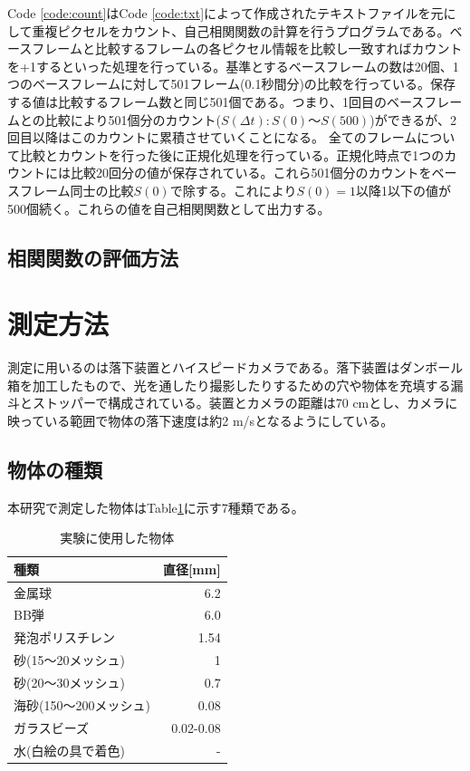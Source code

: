 \documentclass[a4paper,10pt,twocolumn,dvipdfmx]{jsarticle}
\newcommand{\Dt}{\Delta t}
\begin{document}

Code \ref{code:count}はCode \ref{code:txt}によって作成されたテキストファイルを元にして重複ピクセルをカウント、自己相関関数の計算を行うプログラムである。ベースフレームと比較するフレームの各ピクセル情報を比較し一致すればカウントを+1するといった処理を行っている。基準とするベースフレームの数は20個、1つのベースフレームに対して501フレーム(0.1秒間分)の比較を行っている。保存する値は比較するフレーム数と同じ501個である。つまり、1回目のベースフレームとの比較により501個分のカウント($S(\Dt):S(0)〜S(500)$)ができるが、2回目以降はこのカウントに累積させていくことになる。
全てのフレームについて比較とカウントを行った後に正規化処理を行っている。正規化時点で1つのカウントには比較20回分の値が保存されている。これら501個分のカウントをベースフレーム同士の比較$S(0)$で除する。これにより$S(0)=1$以降1以下の値が500個続く。これらの値を自己相関関数として出力する。

\subsection{相関関数の評価方法}

\section{測定方法}
測定に用いるのは落下装置とハイスピードカメラである。落下装置はダンボール箱を加工したもので、光を通したり撮影したりするための穴や物体を充填する漏斗とストッパーで構成されている。装置とカメラの距離は70 cmとし、カメラに映っている範囲で物体の落下速度は約2 m/sとなるようにしている。
\subsection{物体の種類}
本研究で測定した物体はTable\ref{tb:ballkind}に示す7種類である。 \\
\begin{table}[H]
	\caption{実験に使用した物体 \label{tb:ballkind}}
	\begin{tabular}{lr}
		\toprule
		種類 & 直径[mm] \\
		\midrule
		金属球 & 6.2 \\
		BB弾 & 6.0 \\
		発泡ポリスチレン & 1.54 \\
		砂(15〜20メッシュ) & 1 \\
		砂(20〜30メッシュ) & 0.7 \\
		海砂(150〜200メッシュ) & 0.08 \\
		ガラスビーズ & 0.02-0.08 \\
		水(白絵の具で着色) & - \\
		\bottomrule
	\end{tabular}
\end{table}
\end{document}
